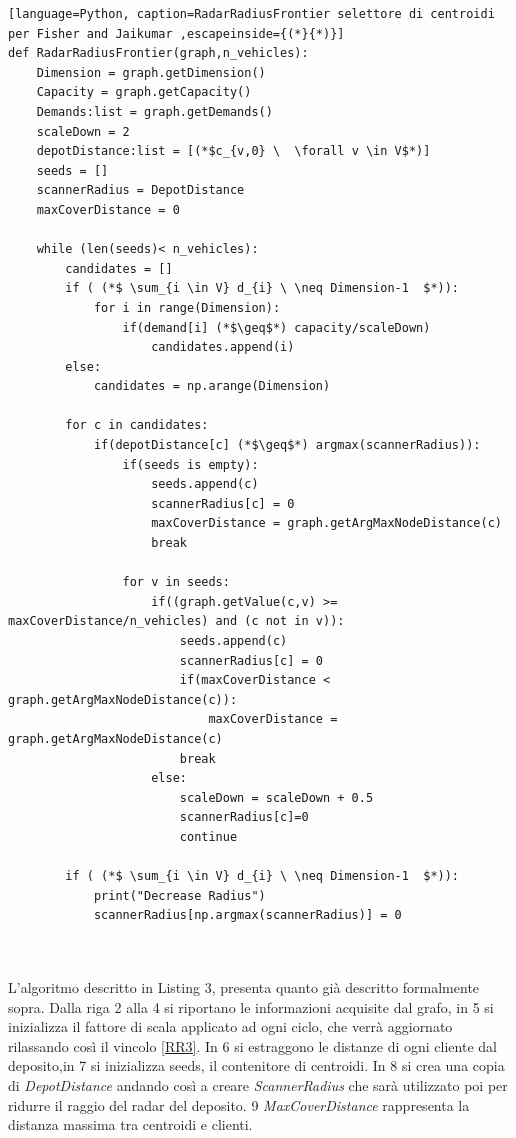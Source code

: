 \documentclass[]{article}
\begin{document}
\begin{lstlisting}[language=Python, caption=RadarRadiusFrontier selettore di centroidi per Fisher and Jaikumar ,escapeinside={(*}{*)}]
def RadarRadiusFrontier(graph,n_vehicles):
	Dimension = graph.getDimension()
	Capacity = graph.getCapacity()
	Demands:list = graph.getDemands()
	scaleDown = 2
	depotDistance:list = [(*$c_{v,0} \  \forall v \in V$*)]
	seeds = []
	scannerRadius = DepotDistance
	maxCoverDistance = 0

	while (len(seeds)< n_vehicles):
		candidates = []
		if ( (*$ \sum_{i \in V} d_{i} \ \neq Dimension-1  $*)):
			for i in range(Dimension):
				if(demand[i] (*$\geq$*) capacity/scaleDown)
					candidates.append(i)
		else:
			candidates = np.arange(Dimension)
		
		for c in candidates:
			if(depotDistance[c] (*$\geq$*) argmax(scannerRadius)):
				if(seeds is empty):
					seeds.append(c)
					scannerRadius[c] = 0
					maxCoverDistance = graph.getArgMaxNodeDistance(c)
					break
			
				for v in seeds:
			 		if((graph.getValue(c,v) >= maxCoverDistance/n_vehicles) and (c not in v)): 
			 			seeds.append(c)
			 			scannerRadius[c] = 0
			 			if(maxCoverDistance < graph.getArgMaxNodeDistance(c)):
			 				maxCoverDistance = graph.getArgMaxNodeDistance(c)
			 			break
			 		else:
			 			scaleDown = scaleDown + 0.5
			 			scannerRadius[c]=0
			 			continue
			 		
		if ( (*$ \sum_{i \in V} d_{i} \ \neq Dimension-1  $*)):
			print("Decrease Radius")
			scannerRadius[np.argmax(scannerRadius)] = 0
			
				
\end{lstlisting}
L'algoritmo descritto in Listing 3, presenta quanto già descritto formalmente sopra. Dalla riga 2 alla 4 si riportano le informazioni acquisite dal grafo, in 5 si inizializza il fattore di scala applicato ad ogni ciclo, che verrà aggiornato rilassando così il vincolo \ref{RR3}. In 6 si estraggono le distanze di ogni cliente dal deposito,in 7 si inizializza seeds, il contenitore di centroidi. In 8 si crea una copia di \textit{DepotDistance} andando così a creare \textit{ScannerRadius} che sarà utilizzato poi per ridurre il raggio del radar del deposito. 9 \textit{MaxCoverDistance} rappresenta la distanza massima tra centroidi e clienti.
\end{document}
